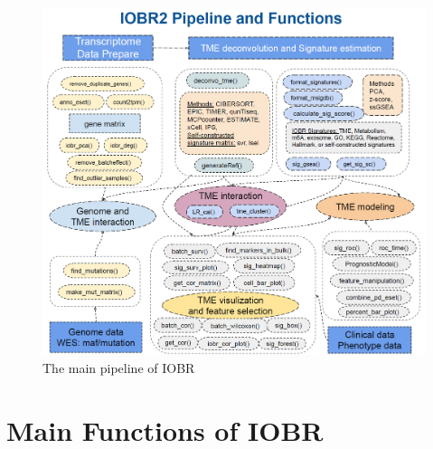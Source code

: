 \documentclass[
  12pt,
]{book}
\begin{document}
\begin{figure}

{\centering \includegraphics[width=0.95\linewidth]{./fig/IOBR-Package} 

}

\caption{The main pipeline of IOBR}\label{fig:flowchart}
\end{figure}

\hypertarget{main-functions-of-iobr}{%
\section{Main Functions of IOBR}\label{main-functions-of-iobr}}
\end{document}
